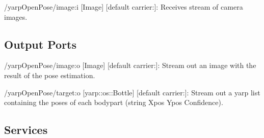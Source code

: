 \begin{DoxyItemize}
\item /yarp\+Open\+Pose/image\+:i \mbox{[}Image\mbox{]} \mbox{[}default carrier\+:\mbox{]}\+: Receives stream of camera images.
\end{DoxyItemize}\hypertarget{group__yarpOpenPose_outputports_sec}{}\subsection{Output Ports}\label{group__yarpOpenPose_outputports_sec}

\begin{DoxyItemize}
\item /yarp\+Open\+Pose/image\+:o \mbox{[}Image\mbox{]} \mbox{[}default carrier\+:\mbox{]}\+: Stream out an image with the result of the pose estimation.
\item /yarp\+Open\+Pose/target\+:o \mbox{[}yarp\+::os\+::\+Bottle\mbox{]} \mbox{[}default carrier\+:\mbox{]}\+: Stream out a yarp list containing the poses of each bodypart (string Xpos Ypos Confidence).
\end{DoxyItemize}\hypertarget{group__yarpOpenPose_services_sec}{}\subsection{Services}\label{group__yarpOpenPose_services_sec}
